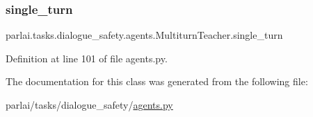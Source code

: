 \subsubsection{\texorpdfstring{single\+\_\+turn}{single\_turn}}
{\footnotesize\ttfamily parlai.\+tasks.\+dialogue\+\_\+safety.\+agents.\+Multiturn\+Teacher.\+single\+\_\+turn}



Definition at line 101 of file agents.\+py.



The documentation for this class was generated from the following file\+:\begin{DoxyCompactItemize}
\item 
parlai/tasks/dialogue\+\_\+safety/\hyperlink{parlai_2tasks_2dialogue__safety_2agents_8py}{agents.\+py}\end{DoxyCompactItemize}
